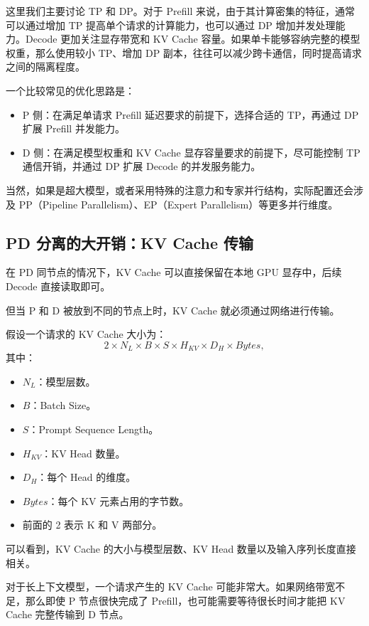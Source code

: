 \documentclass[11pt]{article}
\begin{document}
这里我们主要讨论 TP 和 DP。对于 Prefill 来说，由于其计算密集的特征，通常可以通过增加 TP 提高单个请求的计算能力，也可以通过 DP 增加并发处理能力。Decode 更加关注显存带宽和 KV Cache 容量。如果单卡能够容纳完整的模型权重，那么使用较小 TP、增加 DP 副本，往往可以减少跨卡通信，同时提高请求之间的隔离程度。

一个比较常见的优化思路是：

\begin{itemize}
  \item P 侧：在满足单请求 Prefill 延迟要求的前提下，选择合适的 TP，再通过 DP 扩展 Prefill 并发能力。
  \item D 侧：在满足模型权重和 KV Cache 显存容量要求的前提下，尽可能控制 TP 通信开销，并通过 DP 扩展 Decode 的并发服务能力。
\end{itemize}

当然，如果是超大模型，或者采用特殊的注意力和专家并行结构，实际配置还会涉及 PP（Pipeline Parallelism）、EP（Expert Parallelism）等更多并行维度。

\subsection{PD 分离的大开销：KV Cache 传输}

在 PD 同节点的情况下，KV Cache 可以直接保留在本地 GPU 显存中，后续 Decode 直接读取即可。

但当 P 和 D 被放到不同的节点上时，KV Cache 就必须通过网络进行传输。

假设一个请求的 KV Cache 大小为：
\[
  2 \times N_L \times B \times S \times H_{KV} \times D_H \times Bytes,
\]
其中：

\begin{itemize}
  \item $N_L$：模型层数。
  \item $B$：Batch Size。
  \item $S$：Prompt Sequence Length。
  \item $H_{KV}$：KV Head 数量。
  \item $D_H$：每个 Head 的维度。
  \item $Bytes$：每个 KV 元素占用的字节数。
  \item 前面的 2 表示 K 和 V 两部分。
\end{itemize}

可以看到，KV Cache 的大小与模型层数、KV Head 数量以及输入序列长度直接相关。

对于长上下文模型，一个请求产生的 KV Cache 可能非常大。如果网络带宽不足，那么即使 P 节点很快完成了 Prefill，也可能需要等待很长时间才能把 KV Cache 完整传输到 D 节点。
\end{document}
